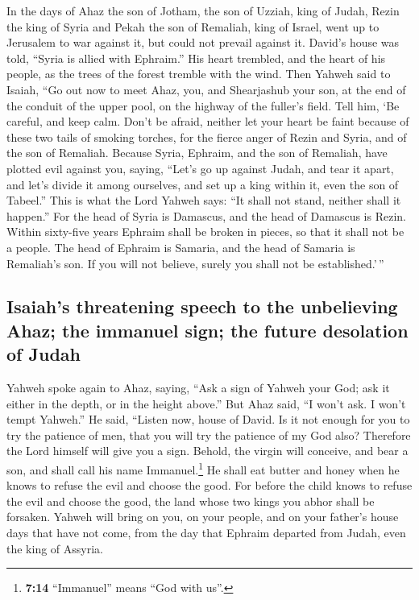  In the days of Ahaz the son of Jotham, the son of Uzziah,
king of Judah, Rezin the king of Syria and Pekah the son of Remaliah,
king of Israel, went up to Jerusalem to war against it, but could not
prevail against it.  David's house was told, ``Syria is
allied with Ephraim.'' His heart trembled, and the heart of his people,
as the trees of the forest tremble with the wind.  Then
Yahweh said to Isaiah, ``Go out now to meet Ahaz, you, and Shearjashub
your son, at the end of the conduit of the upper pool, on the highway of
the fuller's field.  Tell him, `Be careful, and keep calm.
Don't be afraid, neither let your heart be faint because of these two
tails of smoking torches, for the fierce anger of Rezin and Syria, and
of the son of Remaliah.  Because Syria, Ephraim, and the
son of Remaliah, have plotted evil against you, saying, 
``Let's go up against Judah, and tear it apart, and let's divide it
among ourselves, and set up a king within it, even the son of Tabeel.''
 This is what the Lord Yahweh says: ``It shall not stand,
neither shall it happen.''  For the head of Syria is
Damascus, and the head of Damascus is Rezin. Within sixty-five years
Ephraim shall be broken in pieces, so that it shall not be a people.
 The head of Ephraim is Samaria, and the head of Samaria
is Remaliah's son. If you will not believe, surely you shall not be
established.'\,''

\hypertarget{isaiahs-threatening-speech-to-the-unbelieving-ahaz-the-immanuel-sign-the-future-desolation-of-judah}{%
\subsection{Isaiah's threatening speech to the unbelieving Ahaz; the
immanuel sign; the future desolation of
Judah}\label{isaiahs-threatening-speech-to-the-unbelieving-ahaz-the-immanuel-sign-the-future-desolation-of-judah}}

 Yahweh spoke again to Ahaz, saying, 
``Ask a sign of Yahweh your God; ask it either in the depth, or in the
height above.''  But Ahaz said, ``I won't ask. I won't
tempt Yahweh.''  He said, ``Listen now, house of David.
Is it not enough for you to try the patience of men, that you will try
the patience of my God also?  Therefore the Lord himself
will give you a sign. Behold, the virgin will conceive, and bear a son,
and shall call his name Immanuel.\footnote{\textbf{7:14} ``Immanuel''
  means ``God with us''.}  He shall eat butter and honey
when he knows to refuse the evil and choose the good. 
For before the child knows to refuse the evil and choose the good, the
land whose two kings you abhor shall be forsaken.  Yahweh
will bring on you, on your people, and on your father's house days that
have not come, from the day that Ephraim departed from Judah, even the
king of Assyria.

